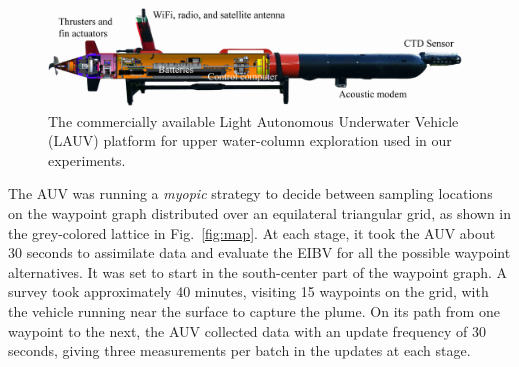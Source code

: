 \documentclass[aoas]{imsart}
\begin{document}
\begin{figure}[!h] 
\centering 
\includegraphics[width=0.98\textwidth]{Figures/web/harald.jpeg}
\caption{The commercially available Light Autonomous Underwater
  Vehicle (LAUV) platform for upper water-column exploration used in
  our experiments.}
\label{fig:lauv}
\end{figure} 

The AUV was running a \textit{myopic} strategy to decide between
sampling locations on the waypoint graph distributed over an
equilateral triangular grid, as shown in the grey-colored lattice in
Fig.~\ref{fig:map}.  At each stage, it took the AUV about 30 seconds
to assimilate data and evaluate the EIBV for all the possible waypoint alternatives.  It
was set to start in the south-center part of the waypoint graph. A
survey took approximately 40 minutes, visiting 15 waypoints
on the grid, with the vehicle running near the surface to capture the
plume. On its path from one waypoint to the next, the AUV collected
data with an update frequency of 30 seconds, giving three measurements
per batch in the updates at each stage.
\end{document}
